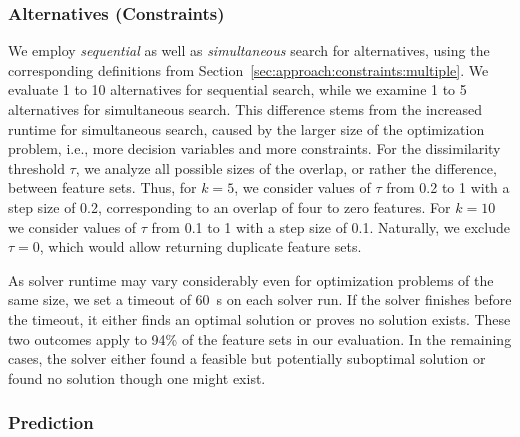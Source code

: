 \documentclass{article}
\theoremstyle{definition}
\begin{document}
\subsubsection{Alternatives (Constraints)}
\label{sec:experimental-design:approaches:alternatives}

We employ \emph{sequential} as well as \emph{simultaneous} search for alternatives, using the corresponding definitions from Section~\ref{sec:approach:constraints:multiple}.
We evaluate 1 to 10 alternatives for sequential search, while we examine 1 to 5 alternatives for simultaneous search.
This difference stems from the increased runtime for simultaneous search, caused by the larger size of the optimization problem, i.e., more decision variables and more constraints.
For the dissimilarity threshold $\tau$, we analyze all possible sizes of the overlap, or rather the difference, between feature sets.
Thus, for $k=5$, we consider values of $\tau$ from 0.2 to 1 with a step size of 0.2, corresponding to an overlap of four to zero features.
For $k=10$ we consider values of $\tau$ from 0.1 to 1 with a step size of 0.1.
Naturally, we exclude $\tau = 0$, which would allow returning duplicate feature sets.

As solver runtime may vary considerably even for optimization problems of the same size, we set a timeout of 60~s on each solver run.
If the solver finishes before the timeout, it either finds an optimal solution or proves no solution exists.
These two outcomes apply to 94\% of the feature sets in our evaluation.
In the remaining cases, the solver either found a feasible but potentially suboptimal solution or found no solution though one might exist.


\subsubsection{Prediction}
\label{sec:experimental-design:approaches:prediction}
\end{document}
